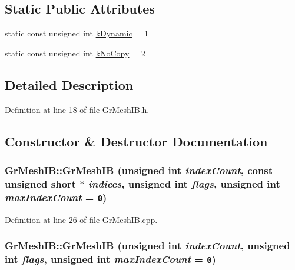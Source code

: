 \subsection*{Static Public Attributes}
\begin{CompactItemize}
\item 
static const unsigned int \hyperlink{class_gr_mesh_i_b_5793b340a735f6ef818f74e6727fcf00}{kDynamic} = 1
\item 
static const unsigned int \hyperlink{class_gr_mesh_i_b_e4996627a2e477914d1b15e38d118885}{kNoCopy} = 2
\end{CompactItemize}


\subsection{Detailed Description}


Definition at line 18 of file GrMeshIB.h.

\subsection{Constructor \& Destructor Documentation}
\hypertarget{class_gr_mesh_i_b_ccc1bb85f10260956c3adeb2f005ee8a}{
\subsubsection[{GrMeshIB}]{\setlength{\rightskip}{0pt plus 5cm}GrMeshIB::GrMeshIB (unsigned int {\em indexCount}, \/  const unsigned short $\ast$ {\em indices}, \/  unsigned int {\em flags}, \/  unsigned int {\em maxIndexCount} = {\tt 0})}}
\label{class_gr_mesh_i_b_ccc1bb85f10260956c3adeb2f005ee8a}




Definition at line 26 of file GrMeshIB.cpp.\hypertarget{class_gr_mesh_i_b_567dd8e750f69193e29e62803625c917}{
\subsubsection[{GrMeshIB}]{\setlength{\rightskip}{0pt plus 5cm}GrMeshIB::GrMeshIB (unsigned int {\em indexCount}, \/  unsigned int {\em flags}, \/  unsigned int {\em maxIndexCount} = {\tt 0})}}
\label{class_gr_mesh_i_b_567dd8e750f69193e29e62803625c917}





